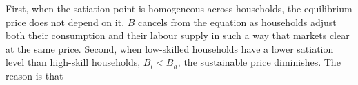 First, when the satiation point is homogeneous across households, the equilibrium price does not depend on it. $B$ cancels from the equation as households adjust both their consumption and their labour supply in such a way that markets clear at the same price. Second, when low-skilled households have a lower satiation level than high-skill households, $B_l<B_h$, the sustainable price diminishes. The reason is that 
\begin{comment}
\paragraph{Solving the model without further assumptions on parameter values}

To explicitly solve the model as functions of $p_n$ I follow these steps:
\begin{enumerate}
\item $p_{nL}$ and $p_{sL}$ follow from equation \ref{mod:pnl} and \ref{mod:psl} directly. 
\item I solve for $w_h$ and $w_l$ as function of $p_{nL}$ and $p_{sL}$ by use of the optimality conditions of the labour input producing firm equations \ref{mod:opt_labhn} to \ref{mod:opt_labls}. Which yields
\begin{align}
w_h=& \frac{p_{sL}^\frac{1-\varepsilon_n}{\varepsilon_s-\varepsilon_n}}{p_{nL}^\frac{1-\varepsilon_s}{\varepsilon_s-\varepsilon_n}}\left(\frac{\varepsilon_s^\frac{\varepsilon_s}{1-\varepsilon_s}(1-\varepsilon_s)}{\varepsilon_n^\frac{\varepsilon_n}{1-\varepsilon_n}(1-\varepsilon_n)}\right)^\frac{(1-\varepsilon_n)(1-\varepsilon_s)}{\varepsilon_s-\varepsilon_n}\\
w_l=& p_{nL}^\frac{1}{1-\varepsilon_n}\left(\frac{\varepsilon_n}{w_h}\right)^{\frac{\varepsilon_n}{1-\varepsilon_n}}(1-\varepsilon_n)
\end{align}
\item using the household optimality conditions I get $c_{sh}, c_{sl}, h_h, h_l$ as a function of $p_n$ and $p_s$
\item from $h_h, h_n$ plus the optimality conditions of the labour-input producing firm I derive $l_{hs}, l_{hn}, l_{ls}, l_{ln}$
\item labour-input production, equations \ref{mod:labN} and \ref{mod:labS}, give $L_s$ and $L_n$
\item sustainable output then follows from the production function \ref{mod:prod_s}
\item
to solve the model completely (only as a function of the price of the numeraire $c_n$: $p_n$), I enforce
the sustainable good's market clearing condition \ref{mod:sus_market}. 
\item all other variables $c_{nh}, c_{nl}, y_n$ follow from the HH sector and the unsustainable good's market clearing which holds by Walras' law.
\end{enumerate}
\end{comment}
